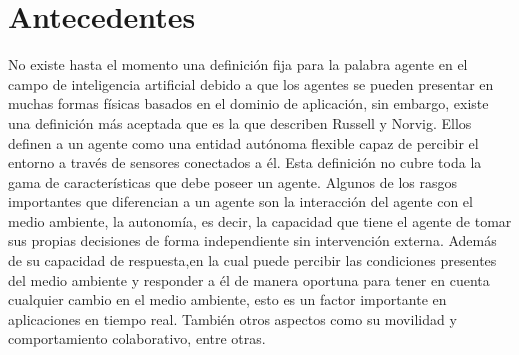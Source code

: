 \documentclass[final,6p,times,twocolumn]{elsarticle}
\begin{document}






\section{Antecedentes}
No existe hasta el momento una definición fija para la palabra agente en el campo de inteligencia artificial debido a que los agentes se pueden presentar en muchas formas físicas basados en el dominio de aplicación, sin embargo, existe una definición más aceptada que es la que describen Russell y Norvig. Ellos definen a un agente \cite{Parasumanna} como una entidad autónoma flexible capaz de percibir el entorno a través de sensores conectados a él. Esta definición no cubre toda la gama de características que debe poseer un agente. Algunos de los rasgos importantes que diferencian a un agente son la interacción del agente con el medio ambiente, la autonomía, es decir, la capacidad que tiene el agente de tomar sus propias decisiones de forma independiente sin intervención externa. Además de su capacidad de respuesta,en la cual puede percibir las condiciones presentes del medio ambiente y responder a él de manera oportuna para tener en cuenta cualquier cambio en el medio ambiente, esto es un factor importante en aplicaciones en tiempo real. También otros aspectos como su movilidad y comportamiento colaborativo, entre otras. 

\label{S:2}
\end{document}
